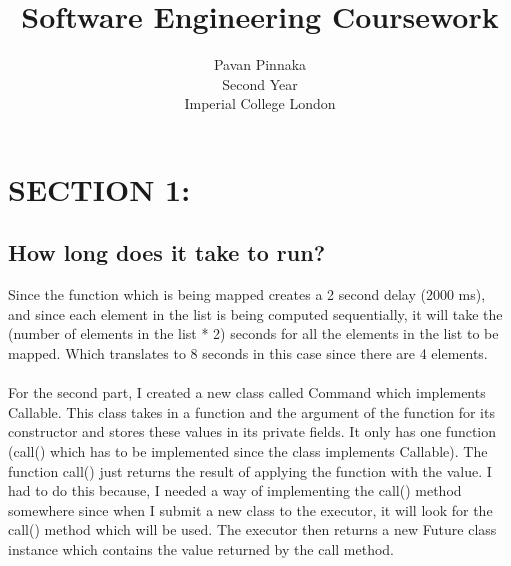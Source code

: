\documentclass[a4paper]{article}
\theoremstyle{definition}
\begin{document}
\title{Software Engineering Coursework}
\date{}
\author{
Pavan Pinnaka \\ 
Second Year \\ 
Imperial College London
}

\maketitle

\section{SECTION 1:}

\subsection{How long does it take to run?}
Since the function which is being mapped creates a 2 second delay (2000 ms), and since each element in the list is being computed sequentially, it will take the (number of elements in the list * 2) seconds for all the elements in the list to be mapped. Which translates to 8 seconds in this case since there are 4 elements.\\\\
For the second part, I created a new class called Command which implements Callable. This class takes in a function and the argument of the function for its constructor and stores these values in its private fields. It only has one function (call() which has to be implemented since the class implements Callable). The function call() just returns the result of applying the function with the value. I had to do this because, I needed a way of implementing the call() method somewhere since when I submit a new class to the executor, it will look for the call() method which will be used. The executor then returns a new Future class instance which contains the value returned by the call method.
\end{document}

